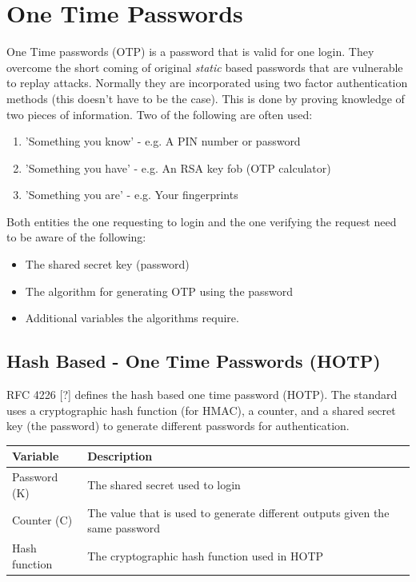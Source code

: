 \documentclass[bsc,frontabs,twoside,singlespacing,parskip,deptreport]{infthesis}     %
\begin{document}
\section{One Time Passwords}
One Time passwords (OTP) is a password that is valid for one login. They overcome the short coming of original \textit{static} based passwords that are vulnerable to replay attacks. Normally they are incorporated using two factor authentication methods (this doesn't have to be the case). This is done by proving knowledge of two pieces of information. Two of the following are often used:
\begin{enumerate}
\item 'Something you know' - e.g. A PIN number or password
\item 'Something you have' - e.g. An RSA key fob (OTP calculator)
\item 'Something you are'  - e.g. Your fingerprints
\end{enumerate}

Both entities the one requesting to login and the one verifying the request need to be aware of the following:
\begin{itemize}
\item The shared secret key (password)
\item The algorithm for generating OTP using the password
\item Additional variables the algorithms require.
\end{itemize}

\subsection{Hash Based - One Time Passwords (HOTP)}
RFC 4226 [?] defines the hash based one time password (HOTP). The standard uses a cryptographic hash function (for HMAC), a counter, and a shared secret key (the password) to generate different passwords for authentication.

\begin{table}[H]
\begin{tabular}{|l|p{10cm}|}
\hline
Variable & Description\\
\hline
Password (K) & The shared secret used to login\\
\hline
Counter (C) & The value that is used to generate different outputs given the same password\\
\hline
Hash function & The cryptographic hash function used in HOTP\\
\hline
\end{tabular}
\end{table}
\end{document}

